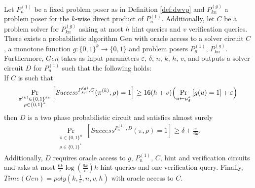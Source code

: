 \begin{theorem}
\label{th:sec_amp_for_dwvp}
Let $P_{n}^{(1)}$ be a fixed problem poser as in Definition \ref{def:dwvp}
and $P_{kn}^{(g)}$ a problem poser for the $k$-wise direct product of $P_{n}^{(1)}$.
Additionally, let $C$ be a problem solver for $P_{kn}^{(g)}$ asking at most $h$ hint queries and $v$ verification queries.
There exists a probabilistic algorithm Gen with oracle access to a solver circuit $C$,
a monotone function $g:\{0,1\}^k \rightarrow \{0,1\}$ and problem posers $P_{n}^{(1)}$, $P_{kn}^{(g)}$.
Furthermore, $\mathit{Gen}$ takes as input parameters $\varepsilon$, $\delta$, $n$, $k$, $h$, $v$, and outputs a solver circuit $D$ for $P_{n}^{(1)}$
such that the following holds: \\
If $C$ is such that
  \begin{align*}
    \underset{\substack{\pi^{(k)} \in \{0,1\}^{kn} \\ \rho \in \{0,1\}^{*}}}{\Pr}\left[\mathit{Success}^{P_{kn}^{(g)}, C}(\pi^{(k)}, \rho) = 1\right]
    \geq 16(h+v)\Bigl(\underset{u \leftarrow \mu_\delta^k}{\Pr}\left[g(u) = 1\right] + \varepsilon\Bigr)
  \end{align*}
then $D$ is a two phase probabilistic circuit and satisfies almost surely
  \begin{align*}
    \underset{\substack{\pi \in \{0,1\}^{n} \\ \rho \in \{0,1\}^{*}}}
    {\Pr}\left[\mathit{Success}^{P_{n}^{(1)},D}(\pi, \rho) = 1\right] \geq \delta + \frac{\varepsilon}{6k}.
  \end{align*}
Additionally, $D$ requires oracle access to $g$, $P_{n}^{(1)}$, $C$, hint and verification circuits
and asks at most $\frac{6k}{\epsilon}\log\left(\frac{6k}{\epsilon}\right) h$ hint queries and one verification query.
Finally, $\mathit{Time}(\mathit{Gen}) = \mathit{poly}(k, \frac{1}{\varepsilon}, n, v, h)$ with oracle access to $C$.
\end{theorem}


